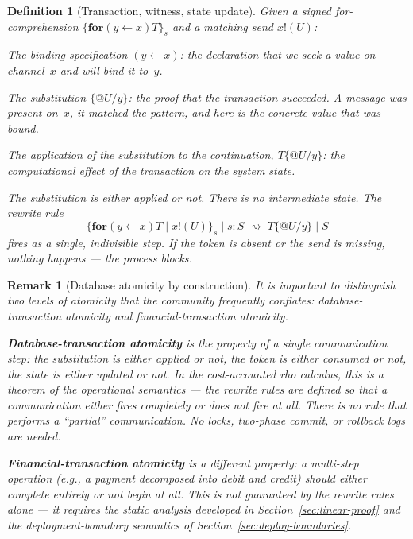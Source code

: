 \documentclass[11pt,a4paper]{article}
\makeatletter
\newtheorem{definition}[theorem]{Definition}
\newtheorem{remark}[theorem]{Remark}
\newcommand{\Par}{\mathbin{|}}
\newcommand{\forc}{\mathbf{for}}
\newcommand{\send}[2]{#1 !\!\left( #2 \right)}
\newcommand{\recv}[3]{\forc\!\left( #1 \leftarrow #2 \right) #3}
\newcommand{\quot}[1]{@#1}
\newcommand{\subst}[3]{#1\{#2 / #3\}}
\newcommand{\signed}[2]{\{#1\}_{#2}}
\newcommand{\red}{\rightsquigarrow}
\makeatother
\begin{document}
\begin{definition}[Transaction, witness, state update]
  \label{def:txn}
  Given a signed for-comprehension
  $\signed{\recv{y}{x}{T}}{s}$ and a matching send
  $\send{x}{U}$:
  \begin{description}[style=nextline, leftmargin=2em, nosep]
    \item[Transaction]
      The binding specification $(y \leftarrow x)$: the
      declaration that we seek a value on channel~$x$ and
      will bind it to~$y$.
    \item[Witness]
      The substitution $\{\quot{U}/y\}$: the proof that the
      transaction succeeded.  A message was present on~$x$, it
      matched the pattern, and here is the concrete value that
      was bound.
    \item[State update]
      The application of the substitution to the
      continuation, $\subst{T}{\quot{U}}{y}$: the
      computational effect of the transaction on the system
      state.
    \item[Atomicity]
      The substitution is either applied or not.  There is no
      intermediate state.  The rewrite rule
      \[
        \signed{\recv{y}{x}{T} \Par \send{x}{U}}{s}
        \Par s : S
        \;\red\;
        \subst{T}{\quot{U}}{y} \Par S
      \]
      fires as a single, indivisible step.  If the token is
      absent or the send is missing, nothing happens ---
      the process blocks.
  \end{description}
\end{definition}

\begin{remark}[Database atomicity by construction]
  \label{rem:db-atomicity}
  It is important to distinguish two levels of atomicity that
  the community frequently conflates:
  \emph{database-transaction atomicity} and
  \emph{financial-transaction atomicity}.

  \textbf{Database-transaction atomicity} is the property of a
  single communication step: the substitution is either applied
  or not, the token is either consumed or not, the state is
  either updated or not.  In the cost-accounted rho calculus,
  this is a \emph{theorem} of the operational semantics ---
  the rewrite rules are defined so that a communication either
  fires completely or does not fire at all.  There is no rule
  that performs a ``partial'' communication.  No locks,
  two-phase commit, or rollback logs are needed.

  \textbf{Financial-transaction atomicity} is a different
  property: a multi-step operation (e.g., a payment decomposed
  into debit and credit) should either complete entirely or not
  begin at all.  This is \emph{not} guaranteed by the rewrite
  rules alone --- it requires the static analysis developed in
  Section~\ref{sec:linear-proof} and the deployment-boundary
  semantics of Section~\ref{sec:deploy-boundaries}.
\end{remark}
\end{document}
